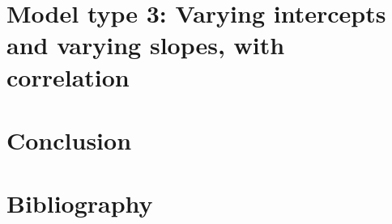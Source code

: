 \documentclass{article}
\begin{document}


\section{Model type 3: Varying intercepts and varying slopes, with correlation}

\section{Conclusion}

\section{Bibliography}
\nocite{*}
\printbibliography
\end{document}

